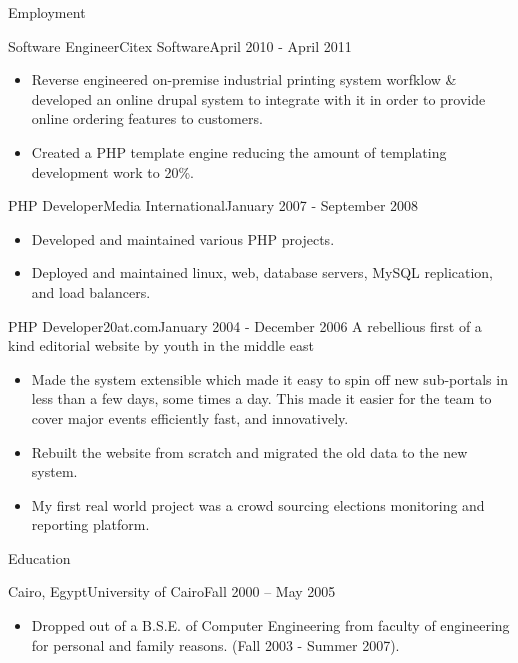 \documentclass[]{mosabcv}
\begin{document}
\begin{cvsection}{Employment}
		\begin{cvsubsection}{Software Engineer}{Citex Software}{April 2010 - April 2011}
			\begin{itemize}
				\item Reverse engineered on-premise industrial printing system worfklow \& developed an online drupal system to integrate with it in order to provide online ordering features to customers.
				\item Created a PHP template engine reducing the amount of templating development work to 20\%.
			\end{itemize}
		\end{cvsubsection}
		
		\begin{cvsubsection}{PHP Developer}{Media International}{January 2007 - September 2008}
			\begin{itemize}
				\item Developed and maintained various PHP projects.
                \item Deployed and maintained linux, web, database servers, MySQL replication, and load balancers.
			\end{itemize}
		\end{cvsubsection}
		
		\begin{cvsubsection}{PHP Developer}{20at.com}{January 2004 - December 2006}
			A rebellious first of a kind editorial website by youth in the middle east
			\begin{itemize}
				\item Made the system extensible which made it easy to spin off new sub-portals in less than a few days, some times a day. This made it easier for the team to cover major events efficiently fast, and innovatively.				
				\item Rebuilt the website from scratch and migrated the old data to the new system.
				\item My first real world project was a crowd sourcing elections monitoring and reporting platform.
			\end{itemize}
		\end{cvsubsection}
		
	\end{cvsection}
	
	\begin{cvsection}{Education}
		\begin{cvsubsection}{Cairo, Egypt}{University of Cairo}{Fall 2000 -- May 2005}
			\begin{itemize}
				\item Dropped out of a B.S.E. of Computer Engineering from faculty of engineering for personal and family reasons. (Fall 2003 - Summer 2007).
			\end{itemize}
		\end{cvsubsection}
	\end{cvsection}
\end{document}
